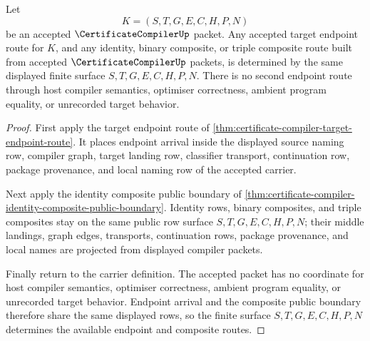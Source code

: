 \begin{theorem}
\label{thm:certificate-compiler-endpoint-route-determinacy-envelope}
Let
$$
K=(S,T,G,E,C,H,P,N)
$$
be an accepted $\CertificateCompilerUp$ packet. Any accepted target endpoint route for $K$, and any identity, binary composite, or triple composite route built from accepted $\CertificateCompilerUp$ packets, is determined by the same displayed finite surface $S,T,G,E,C,H,P,N$. There is no second endpoint route through host compiler semantics, optimiser correctness, ambient program equality, or unrecorded target behavior.
\end{theorem}
\begin{proof}
First apply the target endpoint route of \autoref{thm:certificate-compiler-target-endpoint-route}. It places endpoint arrival inside the displayed source naming row, compiler graph, target landing row, classifier transport, continuation row, package provenance, and local naming row of the accepted carrier.

Next apply the identity composite public boundary of \autoref{thm:certificate-compiler-identity-composite-public-boundary}. Identity rows, binary composites, and triple composites stay on the same public row surface $S,T,G,E,C,H,P,N$; their middle landings, graph edges, transports, continuation rows, package provenance, and local names are projected from displayed compiler packets.

Finally return to the carrier definition. The accepted packet has no coordinate for host compiler semantics, optimiser correctness, ambient program equality, or unrecorded target behavior. Endpoint arrival and the composite public boundary therefore share the same displayed rows, so the finite surface $S,T,G,E,C,H,P,N$ determines the available endpoint and composite routes.
\end{proof}

